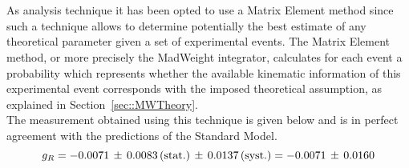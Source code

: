 \\
\\
As analysis technique it has been opted to use a Matrix Element method since such a technique allows to determine potentially the best estimate of any theoretical parameter given a set of experimental events.
The Matrix Element method, or more precisely the MadWeight integrator, calculates for each event a probability which represents whether the available kinematic information of this experimental event corresponds with the imposed theoretical assumption, as explained in Section~\ref{sec::MWTheory}. 
\\
%
The measurement obtained using this technique is given below and is in perfect agreement with the predictions of the Standard Model.
\begin{equation}
 g_{R} = -0.0071 \, \pm \, 0.0083 \, (\textrm{stat.}) \, \pm \, 0.0137  \, (\textrm{syst.}) = -0.0071 \, \pm \, 0.0160
\end{equation}

